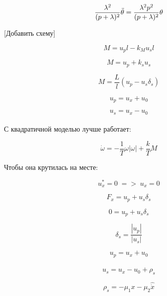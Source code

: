 \begin{equation*}
\frac{\lambda^2}{(p+\lambda)^2}\Ddot{\theta} = \frac{\lambda^2p^2}{(p+\lambda)^2}\theta
\end{equation*}

[Добавить схему]

\begin{equation*}
M = u_pl - k_Mu_sl
\end{equation*}

\begin{equation*}
M = u_p + k_su_s
\end{equation*}

\begin{equation*}
M = \frac{L}{l}(u_p - u_s\delta_s)
\end{equation*}

\begin{equation*}
u_p = u_x + u_0
\end{equation*}

\begin{equation*}
u_s = u_x - u_0
\end{equation*} \\

С квадратичной моделью лучше работает:

\begin{equation*}
\Dot{\omega} = -\frac{1}{T}\omega|\omega| + \frac{k}{T}M
\end{equation*}

Чтобы она крутилась на месте:

\begin{equation*}
u_x^* = 0\; => \; u_x = 0 
\end{equation*}

\begin{equation*}
F_x = u_p + u_s \delta_s
\end{equation*}

\begin{equation*}
0 = u_p + u_s \delta_s
\end{equation*}

\begin{equation*}
\delta_s = \frac{|u_p|}{|u_s|}
\end{equation*}




\begin{equation*}
u_p = u_x + u_0
\end{equation*} \\

\begin{equation*}
u_s = u_x - u_0 + \rho_s
\end{equation*} 

\begin{equation*}
\rho_s = -\mu_1x - \mu_2\hat{\Dot{x}}
\end{equation*} \\
